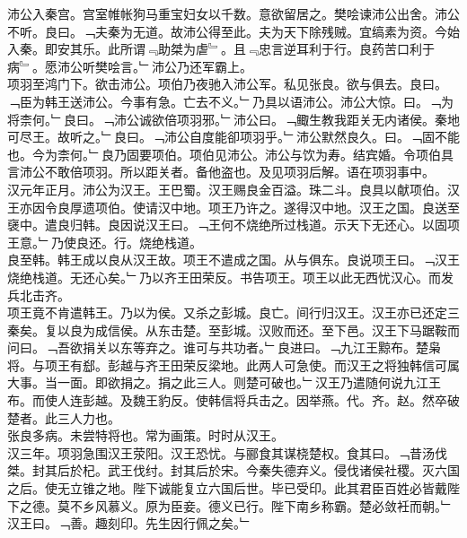 \documentclass{zhvt-classic}
\begin{document}
\hspace*{2em}沛公入秦宫。宫室帷帐狗马重宝妇女以千数。意欲留居之。樊哙谏沛公出舍。沛公不听。良曰。﹁夫秦为无道。故沛公得至此。夫为天下除残贼。宜缟素为资。今始入秦。即安其乐。此所谓﹃助桀为虐﹄。且﹃忠言逆耳利于行。良药苦口利于病﹄。愿沛公听樊哙言。﹂沛公乃还军霸上。\\
\hspace*{2em}项羽至鸿门下。欲击沛公。项伯乃夜驰入沛公军。私见张良。欲与俱去。良曰。﹁臣为韩王送沛公。今事有急。亡去不义。﹂乃具以语沛公。沛公大惊。曰。﹁为将柰何。﹂良曰。﹁沛公诚欲倍项羽邪。﹂沛公曰。﹁鲰生教我距关无内诸侯。秦地可尽王。故听之。﹂良曰。﹁沛公自度能卻项羽乎。﹂沛公默然良久。曰。﹁固不能也。今为柰何。﹂良乃固要项伯。项伯见沛公。沛公与饮为寿。结宾婚。令项伯具言沛公不敢倍项羽。所以距关者。备他盗也。及见项羽后解。语在项羽事中。\\
\hspace*{2em}汉元年正月。沛公为汉王。王巴蜀。汉王赐良金百溢。珠二斗。良具以献项伯。汉王亦因令良厚遗项伯。使请汉中地。项王乃许之。遂得汉中地。汉王之国。良送至襃中。遣良归韩。良因说汉王曰。﹁王何不烧绝所过栈道。示天下无还心。以固项王意。﹂乃使良还。行。烧绝栈道。\\
\hspace*{2em}良至韩。韩王成以良从汉王故。项王不遣成之国。从与俱东。良说项王曰。﹁汉王烧绝栈道。无还心矣。﹂乃以齐王田荣反。书告项王。项王以此无西忧汉心。而发兵北击齐。\\
\hspace*{2em}项王竟不肯遣韩王。乃以为侯。又杀之彭城。良亡。间行归汉王。汉王亦已还定三秦矣。复以良为成信侯。从东击楚。至彭城。汉败而还。至下邑。汉王下马踞鞍而问曰。﹁吾欲捐关以东等弃之。谁可与共功者。﹂良进曰。﹁九江王黥布。楚枭将。与项王有郄。彭越与齐王田荣反梁地。此两人可急使。而汉王之将独韩信可属大事。当一面。即欲捐之。捐之此三人。则楚可破也。﹂汉王乃遣随何说九江王布。而使人连彭越。及魏王豹反。使韩信将兵击之。因举燕。代。齐。赵。然卒破楚者。此三人力也。\\
\hspace*{2em}张良多病。未尝特将也。常为画策。时时从汉王。\\
\hspace*{2em}汉三年。项羽急围汉王荥阳。汉王恐忧。与郦食其谋桡楚权。食其曰。﹁昔汤伐桀。封其后於杞。武王伐纣。封其后於宋。今秦失德弃义。侵伐诸侯社稷。灭六国之后。使无立锥之地。陛下诚能复立六国后世。毕已受印。此其君臣百姓必皆戴陛下之德。莫不乡风慕义。原为臣妾。德义已行。陛下南乡称霸。楚必敛衽而朝。﹂汉王曰。﹁善。趣刻印。先生因行佩之矣。﹂\\
\end{document}
